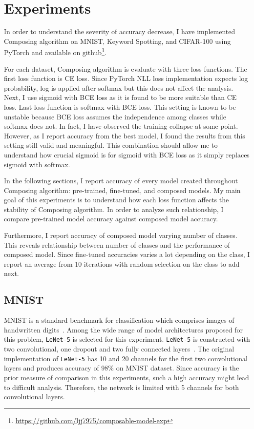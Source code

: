 \documentclass{article}
\begin{document}
\section{Experiments}

In order to understand the severity of accuracy decrease, I have implemented Composing algorithm on MNIST, Keyword Spotting, and CIFAR-100 using PyTorch and available on github\footnote{\url{https://github.com/ljj7975/composable-model-exp}}.

For each dataset, Composing algorithm is evaluate with three loss functions. The first loss function is CE loss. Since PyTorch NLL loss implementation expects log probability, log is applied after softmax but this does not affect the analysis. Next, I use sigmoid with BCE loss as it is found to be more suitable than CE loss. Last loss function is softmax with BCE loss. This setting is known to be unstable because BCE loss assumes the independence among classes while softmax does not. In fact, I have observed the training collapse at some point. However, as I report accuracy from the best model, I found the results from this setting still valid and meaningful. This combination should allow me to understand how crucial sigmoid is for sigmoid with BCE loss as it simply replaces sigmoid with softmax.

In the following sections, I report accuracy of every model created throughout Composing algorithm: pre-trained, fine-tuned, and composed models. My main goal of this experiments is to understand how each loss function affects the stability of Composing algorithm. In order to analyze such relationship, I compare pre-trained model accuracy against composed model accuracy.

Furthermore, I report accuracy of composed model varying number of classes. This reveals relationship between number of classes and the performance of composed model. Since fine-tuned accuracies varies a lot depending on the class, I report an average from 10 iterations with random selection on the class to add next.

\subsection{MNIST}

MNIST is a standard benchmark for classification which comprises images of handwritten digits~\cite{lecun1998gradient}. Among the wide range of model architectures proposed for this problem, \texttt{LeNet-5} is selected for this experiment. \texttt{LeNet-5} is constructed with two convolutional, one dropout and two fully connected layers~\cite{lecun2015lenet}. The original implementation of \texttt{LeNet-5} has 10 and 20 channels for the first two convolutional layers and produces accuracy of 98\% on MNIST dataset. Since accuracy is the prior measure of comparison in this experiments, such a high accuracy might lead to difficult analysis. Therefore, the network is limited with 5 channels for both convolutional layers.
\end{document}
